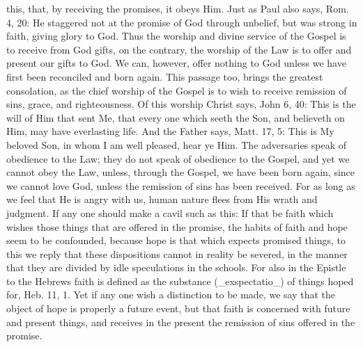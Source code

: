 this, that, by receiving the promises, it obeys Him.  Just as Paul
also says, Rom. 4, 20: He staggered not at the promise of God through
unbelief, but was strong in faith, giving glory to God.  Thus the
worship and divine service of the Gospel is to receive from God gifts,
on the contrary, the worship of the Law is to offer and present our
gifts to God.  We can, however, offer nothing to God unless we have
first been reconciled and born again.  This passage too, brings the
greatest consolation, as the chief worship of the Gospel is to wish
to receive remission of sins, grace, and righteousness.  Of this
worship Christ says, John 6, 40: This is the will of Him that sent Me,
that every one which seeth the Son, and believeth on Him, may have
everlasting life.  And the Father says, Matt. 17, 5: This is My
beloved Son, in whom I am well pleased, hear ye Him.  The adversaries
speak of obedience to the Law; they do not speak of obedience to the
Gospel, and yet we cannot obey the Law, unless, through the Gospel,
we have been born again, since we cannot love God, unless the
remission of sins has been received.  For as long as we feel that He
is angry with us, human nature flees from His wrath and judgment.  If
any one should make a cavil such as this: If that be faith which
wishes those things that are offered in the promise, the habits of
faith and hope seem to be confounded, because hope is that which
expects promised things, to this we reply that these dispositions
cannot in reality be severed, in the manner that they are divided by
idle speculations in the schools.  For also in the Epistle to the
Hebrews faith is defined as the substance (_exspectatio_) of things
hoped for, Heb. 11, 1. Yet if any one wish a distinction to be made,
we say that the object of hope is properly a future event, but that
faith is concerned with future and present things, and receives in
the present the remission of sins offered in the promise.

